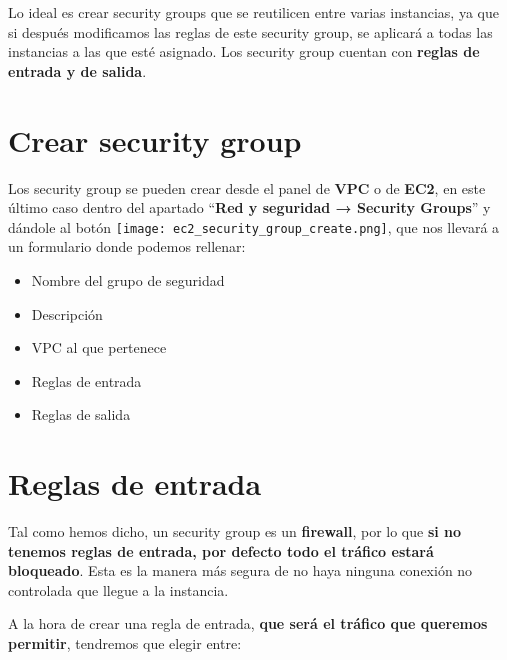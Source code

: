 Lo ideal es crear security groups que se reutilicen entre varias instancias, ya que si después modificamos las reglas de este security group, se aplicará a todas las instancias a las que esté asignado. Los security group cuentan con \textbf{reglas de entrada y de salida}.

\section{Crear security group}

Los security group se pueden crear desde el panel de \textbf{VPC} o de \textbf{EC2}, en este último caso dentro del apartado “\textbf{Red y seguridad → Security Groups}” y dándole al botón \texttt{[image: ec2\_security\_group\_create.png]}, que nos llevará a un formulario donde podemos rellenar:

\begin{itemize}
	\item Nombre del grupo de seguridad
	\item Descripción
	\item VPC al que pertenece
	\item Reglas de entrada
	\item Reglas de salida
\end{itemize}

\section{Reglas de entrada}

Tal como hemos dicho, un security group es un \textbf{firewall}, por lo que \textbf{si no tenemos reglas de entrada, por defecto todo el tráfico estará bloqueado}. Esta es la manera más segura de no haya ninguna conexión no controlada que llegue a la instancia.


A la hora de crear una regla de entrada, \textbf{que será el tráfico que queremos permitir}, tendremos que elegir entre:

